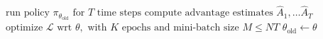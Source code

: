 \begin{algorithmic}
            \State \(\text{run policy } \pi_{\theta_\text{old}} \text{ for } T \text{ time steps}\)
            \State \(\text{compute advantage estimates } \hat{A}_1, \dots \hat{A}_T\)
        \EndFor
        \State \(\text{optimize } \mathcal{L} \text{ wrt } \theta, \text{ with } K \text{ epochs and mini-batch size } M \leq NT\)
        \State \(\theta_{\text{old}} \leftarrow \theta\)
    \EndFor
\end{algorithmic}